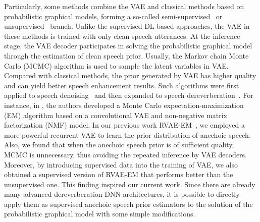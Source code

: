 Particularly, some methods combine the VAE and classical methods based on probabilistic graphical models, forming a so-called semi-supervised~\cite{mysore2011non,bando2018statistical} or unsupervised~\cite{bie2022unsupervised,baby2021speech} branch.
Unlike the supervised DL-based approaches, the VAE in these methods is trained with only clean speech utterances.
At the inference stage, the VAE decoder participates in solving the probabilistic graphical model through the estimation of clean speech prior.
Usually, the Markov chain Monte Carlo (MCMC) algorithm is used to sample the latent variables in VAE.
Compared with classical methods, the prior generated by VAE has higher quality and can yield better speech enhancement results.
Such algorithms were first applied to speech denoising~\cite{mysore2011non,bando2018statistical,bie2022unsupervised} and then expanded to speech dereverberation~\cite{baby2021speech,wang2024rvae}.
For instance, in \cite{baby2021speech}, the authors developed a Monte Carlo expectation-maximization (EM) algorithm based on a convolutional VAE and non-negative matrix factorization (NMF) model.
In our previous work RVAE-EM~\cite{wang2024rvae}, we employed a more powerful recurrent VAE to learn the prior distribution of anechoic speech. 
Also, we found that when the anechoic speech prior is of sufficient quality, MCMC is unnecessary, thus avoiding the repeated inference by VAE decoders.
Moreover, by introducing supervised data into the training of VAE, we also obtained a supervised version of RVAE-EM that performs better than the unsupervised one.
This finding inspired our current work. 
Since there are already many advanced dereverberation DNN architectures, it is possible to directly apply them as supervised anechoic speech prior estimators to the solution of the probabilistic graphical model with some simple modifications.


